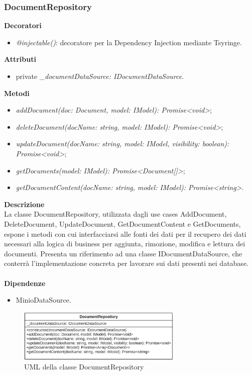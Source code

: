 \subsubsection{DocumentRepository}
\textbf{Decoratori}
\begin{itemize}
    \item \textit{@injectable()}: decoratore per la Dependency Injection mediante Tsyringe.
\end{itemize}
\textbf{Attributi}
\begin{itemize}
    \item private \textit{\_documentDataSource: IDocumentDataSource}.
\end{itemize}
\textbf{Metodi}
\begin{itemize}[itemsep=-4pt]
    \item \textit{addDocument(doc: Document, model: IModel): Promise<void>};
    \item \textit{deleteDocument(docName: string, model: IModel): Promise<void>};
    \item \textit{updateDocument(docName: string, model: IModel, visibility: boolean): Promise<void>};
    \item \textit{getDocuments(model: IModel): Promise<Document[]>};
    \item \textit{getDocumentContent(docName: string, model: IModel): Promise<string>}. 
\end{itemize}
\textbf{Descrizione}\\
La classe DocumentRepository, utilizzata dagli use cases AddDocument, DeleteDocument, UpdateDocument, GetDocumentContent e GetDocuments, espone i metodi con cui interfacciarsi alle fonti dei dati per il recupero dei dati necessari alla logica di business per aggiunta, rimozione, modifica e lettura dei documenti. Presenta un riferimento ad una classe IDocumentDataSource, che conterrà l'implementazione concreta per lavorare sui dati presenti nei database.\\ \\
\textbf{Dipendenze}
\begin{itemize}
    \item MinioDataSource.
\end{itemize}

\begin{figure}[h!]
    \centering  
    \includegraphics[width=0.7\textwidth]{DocumentRepository.png}
    \caption{UML della classe DocumentRepository}
\end{figure}

